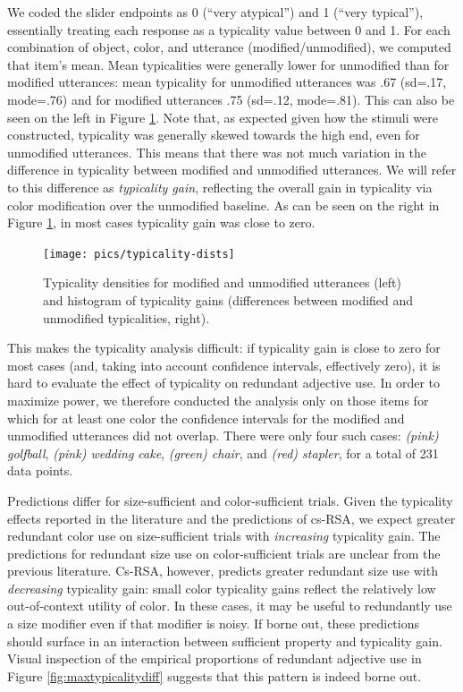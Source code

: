 \documentclass[11pt]{article}
\newcommand{\figref}[1]{Figure \ref{#1}}
\begin{document}
We coded the slider endpoints as 0 (``very atypical'') and 1 (``very typical''), essentially treating each response as a typicality value between 0 and 1. For each combination of object, color, and utterance (modified/unmodified), we computed that item's mean. Mean typicalities were generally lower for unmodified than for modified utterances: mean typicality for unmodified utterances was .67 (sd=.17, mode=.76) and for modified utterances .75 (sd=.12, mode=.81). This can also be seen on the left in \figref{fig:typicalitydists}. Note that, as expected given how the stimuli were constructed, typicality was generally skewed towards the high end, even for unmodified utterances. This means that there was not much variation in  the difference in typicality between modified and unmodified utterances. We will refer to this difference as \emph{typicality gain}, reflecting the overall gain in typicality via color modification over the unmodified baseline. As can be seen on the right in \figref{fig:typicalitydists}, in most cases typicality gain was close to zero.

\begin{figure}
\centering
\texttt{[image: pics/typicality-dists]}
\caption{Typicality densities for modified and unmodified utterances (left) and histogram of typicality gains (differences between modified and unmodified typicalities, right).}
\label{fig:typicalitydists}
\end{figure}

This makes the typicality analysis difficult: if typicality gain is close to zero for most cases (and, taking into account confidence intervals, effectively zero), it is hard to evaluate the effect of typicality on redundant adjective use. In order to maximize power, we therefore conducted the analysis only on those items for which for at least one color the confidence intervals for the modified and unmodified utterances did not overlap. There were only four such cases: \emph{(pink) golfball}, \emph{(pink) wedding cake}, \emph{(green) chair}, and \emph{(red) stapler}, for a total of 231 data points.

Predictions differ for size-sufficient and color-sufficient trials. Given the typicality effects reported in the literature and the predictions of cs-RSA, we expect greater redundant color use on size-sufficient trials with \emph{increasing} typicality gain. The predictions for redundant size use on color-sufficient trials are unclear from the previous literature. Cs-RSA, however,  predicts greater redundant size use with \emph{decreasing} typicality gain: small color typicality gains reflect the relatively low out-of-context utility of color. In these cases, it may be useful to redundantly use a size modifier even if that modifier is noisy. If borne out, these predictions should surface in an interaction between sufficient property and typicality gain. Visual inspection of the empirical proportions of redundant adjective use in \figref{fig:maxtypicalitydiff} suggests that this pattern is indeed borne out.
\end{document}
